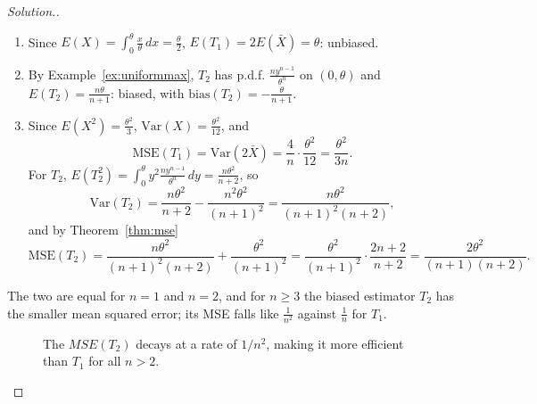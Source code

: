 \documentclass[12pt,a4paper]{report}
\theoremstyle{definition}
\theoremstyle{plain}
\newenvironment{solution}
  {\renewcommand{\qedsymbol}{}\begin{proof}[\textit{Solution}.]}
  {\end{proof}}
\begin{document}
\begin{solution}
\begin{enumerate}
\item[(a)] Since $E(X) = \int_0^\theta\frac{x}{\theta}\,dx = \frac{\theta}{2}$,
$E(T_1) = 2E(\bar X) = \theta$: unbiased.

\item[(b)] By Example~\ref{ex:uniformmax}, $T_2$ has p.d.f.
$\frac{ny^{n-1}}{\theta^n}$ on $(0,\theta)$ and $E(T_2) = \frac{n\theta}{n + 1}$:
biased, with $\text{bias}(T_2) = -\frac{\theta}{n + 1}$.

\item[(c)] Since $E(X^2) = \frac{\theta^2}{3}$, $\text{Var}(X) =
\frac{\theta^2}{12}$, and
\[\text{MSE}(T_1) = \text{Var}(2\bar X) = \frac{4}{n}\cdot\frac{\theta^2}{12} =
\frac{\theta^2}{3n} .\]
For $T_2$, $E(T_2^2) = \int_0^\theta y^2\frac{ny^{n-1}}{\theta^n}\,dy =
\frac{n\theta^2}{n + 2}$, so
\[\text{Var}(T_2) = \frac{n\theta^2}{n + 2} - \frac{n^2\theta^2}{(n+1)^2} =
\frac{n\theta^2}{(n + 1)^2(n + 2)} ,\]
and by Theorem~\ref{thm:mse}
\[\text{MSE}(T_2) = \frac{n\theta^2}{(n + 1)^2(n + 2)} + \frac{\theta^2}{(n +
1)^2} = \frac{\theta^2}{(n + 1)^2}\cdot\frac{2n + 2}{n + 2} = \frac{2\theta^2}{(n +
1)(n + 2)} .\]
\end{enumerate}
The two are equal for $n = 1$ and $n = 2$, and for $n\geq 3$ the biased estimator
$T_2$ has the smaller mean squared error; its MSE falls like $\frac{1}{n^2}$
against $\frac1n$ for $T_1$.

\begin{figure}[H]
\centering
{}
\caption{The $MSE(T_2)$ decays at a rate of $1/n^2$, making it more efficient than $T_1$ for all $n > 2$.}
\end{figure}
\end{solution}
\end{document}
